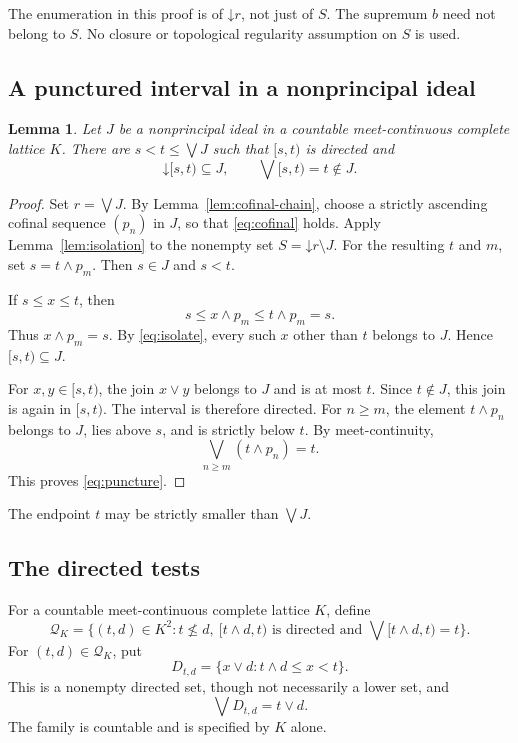 \documentclass[preprint,11pt]{elsarticle}
\newtheorem{lemma}[theorem]{Lemma}
\theoremstyle{definition}
\theoremstyle{remark}
\numberwithin{equation}{section}
\newcommand{\down}[1]{\mathord{\downarrow}#1}
\newcommand{\mc}{\wedge}
\newcommand{\jc}{\vee}
\begin{document}
The enumeration in this proof is of $\down r$, not just of $S$. The supremum $b$ need not belong to $S$. No closure or topological regularity assumption on $S$ is used.

\subsection{A punctured interval in a nonprincipal ideal}
\begin{lemma}\label{lem:puncture}
Let $J$ be a nonprincipal ideal in a countable meet-continuous complete lattice $K$. There are $s<t\le\bigvee J$ such that $[s,t)$ is directed and
\begin{equation}\label{eq:puncture}
 \down[s,t)\subseteq J,\qquad
 \bigvee[s,t)=t\notin J.
\end{equation}
\end{lemma}
\begin{proof}
Set $r=\bigvee J$. By Lemma~\ref{lem:cofinal-chain}, choose a strictly ascending cofinal sequence $(p_n)$ in $J$, so that \eqref{eq:cofinal} holds. Apply Lemma~\ref{lem:isolation} to the nonempty set $S=\down r\setminus J$. For the resulting $t$ and $m$, set $s=t\mc p_m$. Then $s\in J$ and $s<t$.

If $s\le x\le t$, then
\[
 s\le x\mc p_m\le t\mc p_m=s.
\]
Thus $x\mc p_m=s$. By \eqref{eq:isolate}, every such $x$ other than $t$ belongs to $J$. Hence $[s,t)\subseteq J$.

For $x,y\in[s,t)$, the join $x\jc y$ belongs to $J$ and is at most $t$. Since $t\notin J$, this join is again in $[s,t)$. The interval is therefore directed. For $n\ge m$, the element $t\mc p_n$ belongs to $J$, lies above $s$, and is strictly below $t$. By meet-continuity,
\[
 \bigvee_{n\ge m}(t\mc p_n)=t.
\]
This proves \eqref{eq:puncture}.
\end{proof}

The endpoint $t$ may be strictly smaller than $\bigvee J$.

\subsection{The directed tests}
For a countable meet-continuous complete lattice $K$, define
\begin{equation}\label{eq:pairs}
 \mathcal Q_K=\{(t,d)\in K^2:t\nleq d,\
 [t\mc d,t)\text{ is directed and }\bigvee[t\mc d,t)=t\}.
\end{equation}
For $(t,d)\in\mathcal Q_K$, put
\begin{equation}\label{eq:tests}
 D_{t,d}=\{x\jc d:t\mc d\le x<t\}.
\end{equation}
This is a nonempty directed set, though not necessarily a lower set, and
\begin{equation}\label{eq:testsup}
 \bigvee D_{t,d}=t\jc d.
\end{equation}
The family is countable and is specified by $K$ alone.
\end{document}

